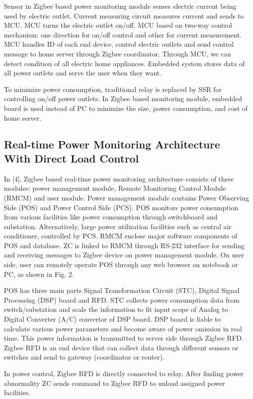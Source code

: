 \documentclass[10pt, conference, compsocconf]{IEEEtran}
\begin{document}
Sensor in Zigbee based power monitoring module senses electric current being used by electric outlet. Current measuring circuit measures current and sends to MCU. MCU turns the electric outlet on/off. MCU based on two-way control mechanism: one direction for on/off control and other for current measurement. MCU handles ID of each end device, control electric outlets and send control message to home server through Zigbee coordinator. Through MCU, we can detect condition of all electric home appliances. Embedded system stores data of all power outlets and serve the user when they want.

To minimize power consumption, traditional relay is replaced by SSR for controlling on/off power outlets. In Zigbee based monitoring module, embedded board is used instead of PC to minimize the size, power consumption, and cost of home server.

\subsection{Real-time Power Monitoring Architecture With Direct Load Control}
In [4], Zigbee based real-time power monitoring architecture consists of three modules: power management module, Remote Monitoring Control Module (RMCM) and user module. Power management module contains Power Observing Side (POS) and Power Control Side (PCS). POS monitors power consumption from various facilities like power consumption through switchboard and substation. Alternatively, large power utilization facilities such as central air conditioner, controlled by PCS. RMCM enclose major software components of POS and database. ZC is linked to RMCM through RS-232 interface for sending and receiving messages to Zigbee device on power management module. On user side, user can remotely operate POS through any web browser on notebook or PC, as shown in Fig. 2.

POS has three main parts Signal Transformation Circuit (STC), Digital Signal Processing (DSP) board and RFD. STC collects power consumption data from switch/substation and scale the information to fit input scope of Analog to Digital Converter (A/C) convertor of DSP board. DSP board is liable to calculate various power parameters and become aware of power omission in real time. This power information is transmitted to server side through Zigbee RFD. Zigbee RFD is an end device that can collect data through different sensors or switches and send to gateway (coordinator or router).

In power control, Zigbee RFD is directly connected to relay. After finding power abnormality ZC sends command to Zigbee RFD to unload assigned power facilities.
\end{document}
